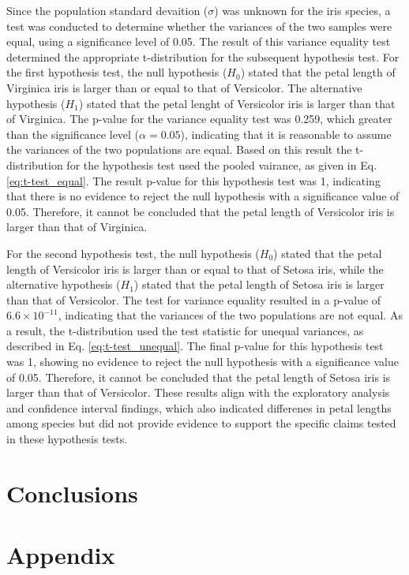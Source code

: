 \documentclass{article}
\begin{document}
Since the population standard devaition ($\sigma$) was unknown for the iris species, a test was conducted to determine whether the variances of the two samples were equal, using a significance level of 0.05. The result of this variance equality test determined the appropriate t-distribution for the subsequent hypothesis test. For the first hypothesis test, the null hypothesis  ($H_0$) stated that the petal length of Virginica iris is larger than or equal to that of Versicolor. The alternative hypothesis ($H_1$) stated that the petal lenght of Versicolor iris is larger than that of Virginica. The p-value for the variance equality test was 0.259, which greater than the significance level ($\alpha = 0.05$), indicating that it is reasonable to assume the variances of the two populations are equal. Based on this result the t-distribution for the hypothesis test used the pooled vairance, as given in Eq. \ref{eq:t-test_equal}. The result p-value for this hypothesis test was 1, indicating that there is no evidence to reject the null hypothesis with a significance value of 0.05. Therefore, it cannot be concluded that the petal length of Versicolor iris is larger than that of Virginica.

 For the second hypothesis test, the null hypothesis ($H_0$) stated that the petal length of Versicolor iris is larger than or equal to that of Setosa iris, while the alternative hypothesis ($H_1$) stated that the petal length of Setosa iris is larger than that of Versicolor. The test for variance equality resulted in a p-value of $6.6\times10^{-11}$, indicating that the variances of the two populations are not equal. As a result, the t-distribution used the test statistic for unequal variances, as described in Eq. \ref{eq:t-test_unequal}. The final p-value for this hypothesis test was 1, showing no evidence to reject the null hypothesis with a significance value of 0.05. Therefore, it cannot be concluded that the petal length of Setosa iris is larger than that of Versicolor. These results align with the exploratory analysis and confidence interval findings, which also indicated differenes in petal lengths among species but did not provide evidence to support the specific claims tested in these hypothesis tests. 

\section{Conclusions}

\color{black}
\newpage
\section{Appendix}
\end{document}
